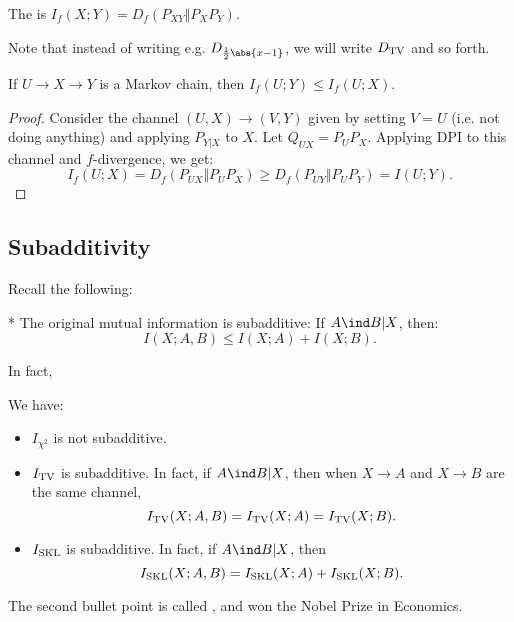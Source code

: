 \begin{defn}
	The  is $I_f(X;Y) = D_f(P_{XY} \Vert P_XP_Y)$.
\end{defn}

Note that instead of writing e.g. $D_{\frac 12 \abs{x-1}}$, we will write $D_{\textnormal{TV}}$ and so forth.

\begin{thm}
	If $U\to X \to Y$ is a Markov chain, then $I_f(U;Y) \leq I_f(U;X)$.
\end{thm}

\begin{proof}
	Consider the channel $(U,X) \to (V,Y)$ given by setting $V = U$ (i.e. not doing anything) and applying $P_{Y|X}$ to $X$. Let $Q_{UX} = P_UP_X$. 
	Applying DPI to this channel and $f$-divergence, we get: \[
		I_f(U;X) = D_f(P_{UX} \Vert P_U P_X) \geq D_f(P_{UY} \Vert P_UP_Y) = I(U;Y).
	\]
\end{proof}

\subsection{Subadditivity}

Recall the following:

\begin{fact}*
	The original mutual information is subadditive: If $A\ind B | X$, then:\[
		I(X;A,B) \leq I(X;A) + I(X;B).
	\]
\end{fact}

In fact, 

\begin{fact}
	We have: 
	\begin{itemize}
		\item $I_{\chi^2}$ is not subadditive.
		\item $I_{\textnormal{TV}}$ is subadditive. In fact, if $A\ind B | X$, then when $X\to A$ and $X\to B$ are the same channel, \[
				I_{\textnormal{TV}}(X;A,B) = I_{\textnormal{TV}}(X;A) = I_{\textnormal{TV}}(X;B).
			\]
		\item $I_{\textnormal{SKL}}$ is subadditive. In fact, if $A\ind B | X$, then \[
				I_{\textnormal{SKL}}(X;A,B) = I_{\textnormal{SKL}} (X;A) + I_{\textnormal{SKL}}(X;B).
			\]
	\end{itemize}
\end{fact}

The second bullet point is called , and won the Nobel Prize in Economics.

